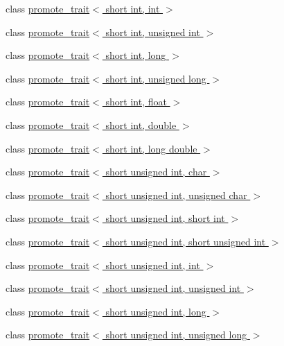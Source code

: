 \begin{DoxyCompactItemize}
\item 
class \hyperlink{classpromote__trait_3_01short_01int_00_01int_01_4}{promote\+\_\+trait$<$ short int, int $>$}
\item 
class \hyperlink{classpromote__trait_3_01short_01int_00_01unsigned_01int_01_4}{promote\+\_\+trait$<$ short int, unsigned int $>$}
\item 
class \hyperlink{classpromote__trait_3_01short_01int_00_01long_01_4}{promote\+\_\+trait$<$ short int, long $>$}
\item 
class \hyperlink{classpromote__trait_3_01short_01int_00_01unsigned_01long_01_4}{promote\+\_\+trait$<$ short int, unsigned long $>$}
\item 
class \hyperlink{classpromote__trait_3_01short_01int_00_01float_01_4}{promote\+\_\+trait$<$ short int, float $>$}
\item 
class \hyperlink{classpromote__trait_3_01short_01int_00_01double_01_4}{promote\+\_\+trait$<$ short int, double $>$}
\item 
class \hyperlink{classpromote__trait_3_01short_01int_00_01long_01double_01_4}{promote\+\_\+trait$<$ short int, long double $>$}
\item 
class \hyperlink{classpromote__trait_3_01short_01unsigned_01int_00_01char_01_4}{promote\+\_\+trait$<$ short unsigned int, char $>$}
\item 
class \hyperlink{classpromote__trait_3_01short_01unsigned_01int_00_01unsigned_01char_01_4}{promote\+\_\+trait$<$ short unsigned int, unsigned char $>$}
\item 
class \hyperlink{classpromote__trait_3_01short_01unsigned_01int_00_01short_01int_01_4}{promote\+\_\+trait$<$ short unsigned int, short int $>$}
\item 
class \hyperlink{classpromote__trait_3_01short_01unsigned_01int_00_01short_01unsigned_01int_01_4}{promote\+\_\+trait$<$ short unsigned int, short unsigned int $>$}
\item 
class \hyperlink{classpromote__trait_3_01short_01unsigned_01int_00_01int_01_4}{promote\+\_\+trait$<$ short unsigned int, int $>$}
\item 
class \hyperlink{classpromote__trait_3_01short_01unsigned_01int_00_01unsigned_01int_01_4}{promote\+\_\+trait$<$ short unsigned int, unsigned int $>$}
\item 
class \hyperlink{classpromote__trait_3_01short_01unsigned_01int_00_01long_01_4}{promote\+\_\+trait$<$ short unsigned int, long $>$}
\item 
class \hyperlink{classpromote__trait_3_01short_01unsigned_01int_00_01unsigned_01long_01_4}{promote\+\_\+trait$<$ short unsigned int, unsigned long $>$}

\end{DoxyCompactItemize}
